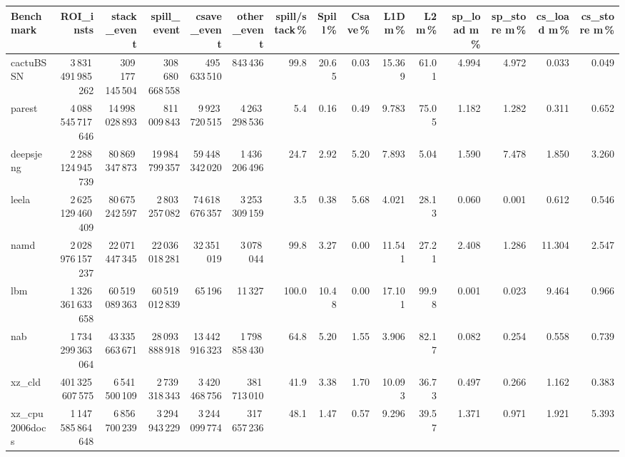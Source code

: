 \documentclass[9pt,landscape,a4paper]{article}
\begin{document}
\vspace{2mm}
\centering
\begin{adjustbox}{max width=\textwidth, max totalheight=0.50\textheight}%
\begin{tabular}{lrrrrrrrrrrrrrr}
\toprule
Benchmark & ROI\_insts & stack\_event & \textbf{spill\_event} & csave\_event & other\_event & spill/stack\,\% & Spill\,\% & Csave\,\% & L1D m\,\% & L2 m\,\% & sp\_load m\,\% & sp\_store m\,\% & cs\_load m\,\% & cs\_store m\,\% \\
\midrule
cactuBSSN & 3\,831\,491\,985\,262 & 309\,177\,145\,504 & 308\,680\,668\,558 & 495\,633\,510 & 843\,436 & 99.8 & 20.65 & 0.03 & 15.369 & 61.01 & 4.994 & 4.972 & 0.033 & 0.049 \\
parest & 4\,088\,545\,717\,646 & 14\,998\,028\,893 & 811\,009\,843 & 9\,923\,720\,515 & 4\,263\,298\,536 & 5.4 & 0.16 & 0.49 & 9.783 & 75.05 & 1.182 & 1.282 & 0.311 & 0.652 \\
deepsjeng & 2\,288\,124\,945\,739 & 80\,869\,347\,873 & 19\,984\,799\,357 & 59\,448\,342\,020 & 1\,436\,206\,496 & 24.7 & 2.92 & 5.20 & 7.893 & 5.04 & 1.590 & 7.478 & 1.850 & 3.260 \\
leela & 2\,625\,129\,460\,409 & 80\,675\,242\,597 & 2\,803\,257\,082 & 74\,618\,676\,357 & 3\,253\,309\,159 & 3.5 & 0.38 & 5.68 & 4.021 & 28.13 & 0.060 & 0.001 & 0.612 & 0.546 \\
namd & 2\,028\,976\,157\,237 & 22\,071\,447\,345 & 22\,036\,018\,281 & 32\,351\,019 & 3\,078\,044 & 99.8 & 3.27 & 0.00 & 11.541 & 27.21 & 2.408 & 1.286 & 11.304 & 2.547 \\
lbm & 1\,326\,361\,633\,658 & 60\,519\,089\,363 & 60\,519\,012\,839 & 65\,196 & 11\,327 & 100.0 & 10.48 & 0.00 & 17.101 & 99.98 & 0.001 & 0.023 & 9.464 & 0.966 \\
nab & 1\,734\,299\,363\,064 & 43\,335\,663\,671 & 28\,093\,888\,918 & 13\,442\,916\,323 & 1\,798\,858\,430 & 64.8 & 5.20 & 1.55 & 3.906 & 82.17 & 0.082 & 0.254 & 0.558 & 0.739 \\
xz\_cld & 401\,325\,607\,575 & 6\,541\,500\,109 & 2\,739\,318\,343 & 3\,420\,468\,756 & 381\,713\,010 & 41.9 & 3.38 & 1.70 & 10.093 & 36.73 & 0.497 & 0.266 & 1.162 & 0.383 \\
xz\_cpu2006docs & 1\,147\,585\,864\,648 & 6\,856\,700\,239 & 3\,294\,943\,229 & 3\,244\,099\,774 & 317\,657\,236 & 48.1 & 1.47 & 0.57 & 9.296 & 39.57 & 1.371 & 0.971 & 1.921 & 5.393 \\

\end{tabular}
\end{adjustbox}
\end{document}
